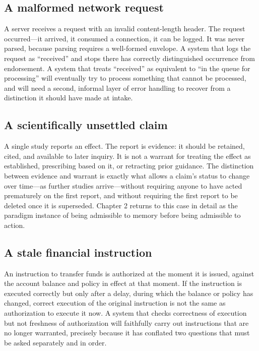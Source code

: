 \documentclass[11pt,openany]{book}
\begin{document}
\subsection{A malformed network request}

A server receives a request with an invalid content-length header. The request
occurred---it arrived, it consumed a connection, it can be logged. It was never
parsed, because parsing requires a well-formed envelope. A system that logs the
request as ``received'' and stops there has correctly distinguished occurrence
from endorsement. A system that treats ``received'' as equivalent to ``in the
queue for processing'' will eventually try to process something that cannot be
processed, and will need a second, informal layer of error handling to recover
from a distinction it should have made at intake.

\subsection{A scientifically unsettled claim}

A single study reports an effect. The report is evidence: it should be
retained, cited, and available to later inquiry. It is not a warrant for
treating the effect as established, prescribing based on it, or retracting
prior guidance. The distinction between evidence and warrant is exactly what
allows a claim's status to change over time---as further studies arrive---without
requiring anyone to have acted prematurely on the first report, and without
requiring the first report to be deleted once it is superseded. Chapter 2
returns to this case in detail as the paradigm instance of being admissible to
memory before being admissible to action.

\subsection{A stale financial instruction}

An instruction to transfer funds is authorized at the moment it is issued,
against the account balance and policy in effect at that moment. If the
instruction is executed correctly but only after a delay, during which the
balance or policy has changed, correct execution of the original instruction
is not the same as authorization to execute it now. A system that checks
correctness of execution but not freshness of authorization will faithfully
carry out instructions that are no longer warranted, precisely because it has
conflated two questions that must be asked separately and in order.
\end{document}
